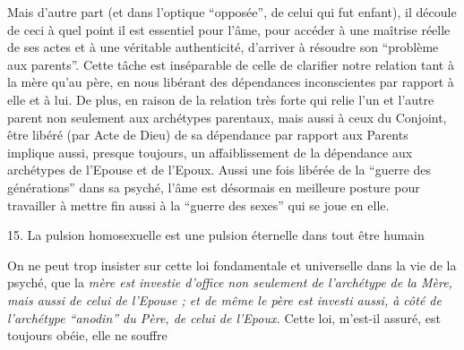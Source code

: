 Mais d'autre part (et dans l'optique ``opposée'', de celui qui fut enfant), il découle de ceci à quel point il est essentiel pour l'âme, pour accéder à une maîtrise réelle de ses actes et à une véritable authenticité, d'arriver à résoudre son ``problème aux parents''. Cette tâche est inséparable de celle de clarifier notre relation tant à la mère qu'au père, en nous libérant des dépendances inconscientes par rapport à elle et à lui. De plus, en raison de la relation très forte qui relie l'un et l'autre parent non seulement aux archétypes parentaux, mais aussi à ceux du Conjoint, être libéré (par Acte de Dieu) de sa dépendance par rapport aux Parents implique aussi, presque toujours, un affaiblissement de la dépendance aux archétypes de l'Epouse et de l'Epoux. Aussi une fois libérée de la ``guerre des générations'' dans sa psyché, l'âme est désormais en meilleure posture pour travailler à mettre fin aussi à la ``guerre des sexes'' qui se joue en elle.

15. La pulsion homosexuelle est une pulsion éternelle dans tout être humain

On ne peut trop insister sur cette loi fondamentale et universelle dans la vie de la psyché, que la \textit{mère est investie d'office non seulement de l'archétype de la Mère, mais aussi de celui de l'Epouse ; et de même le père est investi aussi, à côté de l'archétype ``anodin'' du Père, de celui de l'Epoux.} Cette loi, m'est-il assuré, est toujours obéie, elle ne souffre

